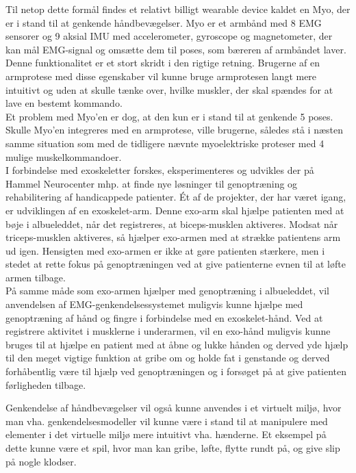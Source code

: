 Til netop dette formål findes et relativt billigt wearable device kaldet en Myo, der er i stand til at genkende håndbevægelser. Myo er et armbånd med 8 EMG sensorer og 9 aksial IMU med accelerometer, gyroscope og magnetometer, der kan mål EMG-signal og omsætte dem til poses, som bæreren af armbåndet laver. \\
Denne funktionalitet er et stort skridt i den rigtige retning. Brugerne af en armprotese med disse egenskaber vil kunne bruge armprotesen langt mere intuitivt og uden at skulle tænke over, hvilke muskler, der skal spændes for at lave en bestemt kommando.\\
Et problem med Myo'en er dog, at den kun er i stand til at genkende 5 poses. Skulle Myo'en integreres med en armprotese, ville brugerne, således stå i næsten samme situation som med de tidligere nævnte myoelektriske proteser med 4 mulige muskelkommandoer.\\

I forbindelse med exoskeletter forskes, eksperimenteres og udvikles der på Hammel Neurocenter mhp. at finde nye løsninger til genoptræning og rehabilitering af handicappede patienter. Ét af de projekter, der har været igang, er udviklingen af en exoskelet-arm\citep{RefWorks:7}. Denne exo-arm skal hjælpe patienten med at bøje i albueleddet, når det registreres, at biceps-musklen aktiveres. Modsat når triceps-musklen aktiveres, så hjælper exo-armen med at strække patientens arm ud igen. Hensigten med exo-armen er ikke at gøre patienten stærkere, men i stedet at rette fokus på genoptræningen ved at give patienterne evnen til at løfte armen tilbage.\\

På samme måde som exo-armen hjælper med genoptræning i albueleddet, vil anvendelsen af EMG-genkendelsessystemet muligvis kunne hjælpe med genoptræning af hånd og fingre i forbindelse med en exoskelet-hånd. Ved at registrere aktivitet i musklerne i underarmen, vil en exo-hånd muligvis kunne bruges til at hjælpe en patient med at åbne og lukke hånden og derved yde hjælp til den meget vigtige funktion at gribe om og holde fat i genstande og derved forhåbentlig være til hjælp ved genoptræningen og i forsøget på at give patienten førligheden tilbage.

Genkendelse af håndbevægelser vil også kunne anvendes i et virtuelt miljø, hvor man vha.  genkendelsesmodeller vil kunne være i stand til at manipulere med elementer i det virtuelle miljø mere intuitivt vha. hænderne. Et eksempel på dette kunne være et spil, hvor man kan gribe, løfte, flytte rundt på, og give slip på nogle klodser.
